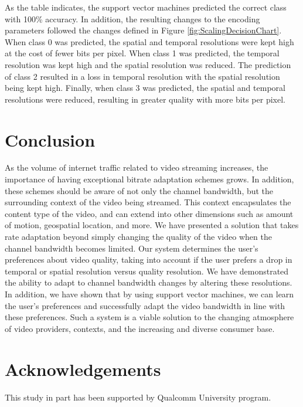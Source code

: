 \documentclass[preprint, 12pt]{elsarticle}
\begin{document}
As the table indicates, the support vector machines predicted the correct class with 100\% accuracy. In addition, the resulting changes to the encoding parameters followed the changes defined in Figure \ref{fig:ScalingDecisionChart}. When class 0 was predicted, the spatial and temporal resolutions were kept high at the cost of fewer bits per pixel. When class 1 was predicted, the temporal resolution was kept high and the spatial resolution was reduced. The prediction of class 2 resulted in a loss in temporal resolution with the spatial resolution being kept high. Finally, when class 3 was predicted, the spatial and temporal resolutions were reduced, resulting in greater quality with more bits per pixel. 

\section{Conclusion}
\label{sec:Conclusion}
As the volume of internet traffic related to video streaming increases, the importance of having exceptional bitrate adaptation schemes grows. In addition, these schemes should be aware of not only the channel bandwidth, but the surrounding context of the video being streamed. This context encapsulates the content type of the video, and can extend into other dimensions such as amount of motion, geospatial location, and more. We have presented a solution that takes rate adaptation beyond simply changing the quality of the video when the channel bandwidth becomes limited. Our system determines the user’s preferences about video quality, taking into account if the user prefers a drop in temporal or spatial resolution versus quality resolution. We have demonstrated the ability to adapt to channel bandwidth changes by altering these resolutions. In addition, we have shown that by using support vector machines, we can learn the user’s preferences and successfully adapt the video bandwidth in line with these preferences. Such a system is a viable solution to the changing atmosphere of video providers, contexts, and the increasing and diverse consumer base.

\section*{Acknowledgements}
This study in part has been supported by Qualcomm University program. 


{}
\end{document}
